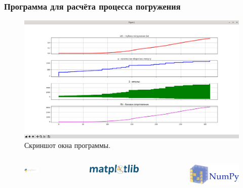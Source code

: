 \documentclass{beamer}
\begin{document}
    \begin{frame}
        \frametitle{Программа для расчёта процесса погружения}
        \begin{figure}
            \includegraphics[width=0.7\linewidth]{screenshot}
            \caption{Скриншот окна программы.}
        \end{figure}
        \begin{columns}
 
            \begin{figure}
                \includegraphics[width=0.8\linewidth]{python-logo}
            \end{figure}
             
            \begin{figure}
                \includegraphics[width=0.8\linewidth]{matplotlib-logo}
            \end{figure}

            \begin{figure}
                \includegraphics[width=0.8\linewidth]{numpy-logo}
            \end{figure}

            \end{columns}
    \end{frame}
\end{document}
